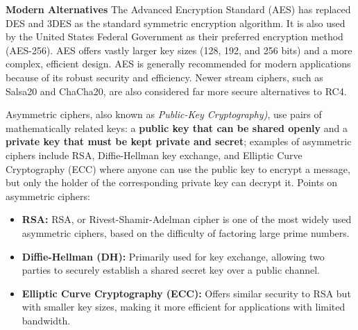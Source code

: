 \textbf{ Modern Alternatives}
The Advanced Encryption Standard (AES) has replaced DES and 3DES as the standard symmetric encryption algorithm. It is also used by the United States Federal Government as their preferred encryption method (AES-256). AES offers vastly larger key sizes (128, 192, and 256 bits) and a more complex, efficient design. AES is generally recommended for modern applications because of its robust security and efficiency. Newer stream ciphers, such as Salsa20 and ChaCha20, are also considered far more secure alternatives to RC4.

 Asymmetric ciphers, also known as \textit{Public-Key Cryptography)}, use pairs of mathematically related keys: a \textbf{public key that can be shared openly} and a \textbf{private key that must be kept private and secret}; examples of asymmetric ciphers include RSA, Diffie-Hellman key exchange, and Elliptic Curve Cryptography (ECC) where anyone can use the public key to encrypt a message, but only the holder of the corresponding private key can decrypt it. Points on asymmetric ciphers:
\begin{itemize}
    \item \textbf{RSA:} RSA, or Rivest-Shamir-Adelman cipher is one of the most widely used asymmetric ciphers, based on the difficulty of factoring large prime numbers.
    \item \textbf{Diffie-Hellman (DH):} Primarily used for key exchange, allowing two parties to securely establish a shared secret key over a public channel.
    \item \textbf{Elliptic Curve Cryptography (ECC):} Offers similar security to RSA but with smaller key sizes, making it more efficient for applications with limited bandwidth.
\end{itemize}

